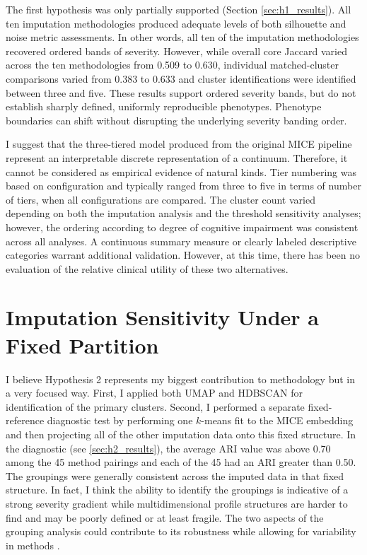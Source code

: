 The first hypothesis was only partially supported (Section \ref{sec:h1_results}). All ten imputation methodologies produced adequate levels of both silhouette and noise metric assessments. In other words, all ten of the imputation methodologies recovered ordered bands of severity. However, while overall core Jaccard varied across the ten methodologies from 0.509 to 0.630, individual matched-cluster comparisons varied from 0.383 to 0.633 and cluster identifications were identified between three and five. These results support ordered severity bands, but do not establish sharply defined, uniformly reproducible phenotypes. Phenotype boundaries can shift without disrupting the underlying severity banding order.

I suggest that the three-tiered model produced from the original MICE pipeline represent an interpretable discrete representation of a continuum. Therefore, it cannot be considered as empirical evidence of natural kinds. Tier numbering was based on configuration and typically ranged from three to five in terms of number of tiers, when all configurations are compared. The cluster count varied depending on both the imputation analysis and the threshold sensitivity analyses; however, the ordering according to degree of cognitive impairment was consistent across all analyses. A continuous summary measure or clearly labeled descriptive categories warrant additional validation. However, at this time, there has been no evaluation of the relative clinical utility of these two alternatives.

\section{Imputation Sensitivity Under a Fixed Partition}
I believe Hypothesis 2 represents my biggest contribution to methodology but in a very focused way. First, I applied both UMAP and HDBSCAN for identification of the primary clusters. Second, I performed a separate fixed-reference diagnostic test by performing one \(k\)-means fit to the MICE embedding and then projecting all of the other imputation data onto this fixed structure. In the diagnostic (see \textsection{}\ref{sec:h2_results}), the average ARI value was above 0.70 among the 45 method pairings and each of the 45 had an ARI greater than 0.50. The groupings were generally consistent across the imputed data in that fixed structure. In fact, I think the ability to identify the groupings is indicative of a strong severity gradient while multidimensional profile structures are harder to find and may be poorly defined or at least fragile. The two aspects of the grouping analysis could contribute to its robustness while allowing for variability in methods \parencite{rubin1987multiple}.

